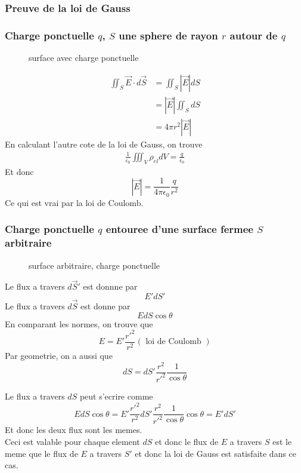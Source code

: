 \documentclass[../main.tex]{subfiles}
\begin{document}
\subsubsection{Preuve de la loi de Gauss}
\subsubsection*{Charge ponctuelle $q$, $S$ une sphere de rayon $r$ autour de $q$}

\begin{figure}[H]
    \centering
    \caption{surface avec charge ponctuelle}
    \label{fig:surface-avec-charge-ponctuelle}
\end{figure}
\begin{align*}
\iint_S \vec{E} \cdot d \vec{S} &= \iint_S |\vec{E}| d S\\
&= |\vec{E}| \iint_S d S\\
&= 4 \pi r^{2} |\vec{E}|
\end{align*}
En calculant l'autre cote de la loi de Gauss, on trouve
\begin{align*}
\frac{1}{\epsilon_0} \iiint_V\rho_{el}  d V = \frac{q}{\epsilon_0}
\end{align*}
Et donc 
\[ 
|\vec{E}| = \frac{1}{4 \pi \epsilon_0} \frac{q}{r^{2}}
\]
Ce qui est vrai par la loi de Coulomb.

\subsubsection*{Charge ponctuelle $q$ entouree d'une surface fermee $S$ arbitraire}

\begin{figure}[H]
    \centering
    \caption{surface arbitraire, charge ponctuelle}
    \label{fig:surface-arbitraire,-charge-ponctuelle}
\end{figure}
Le flux a travers $d\vec{S}'$ est donnne par
\[ 
E' dS'
\]
Le flux a travers $d \vec{S}$ est donne par
\[ 
E dS \cos \theta 
\]
En comparant les normes, on trouve que
\[ 
	E = E' \frac{r'^{2}}{r^{2}} ( \text{ loi de Coulomb } ) 
\]
Par geometrie, on a aussi que
\[ 
d S = d S' \frac{r^{2}}{r'^{2}} \frac{1}{\cos \theta}
\]

Le flux a travers $dS$ peut s'ecrire comme
\[ 
E dS \cos \theta = E' \frac{r'^{2}}{r^{2} } dS' \frac{r^{2}}{r'^{2}} \frac{1}{\cos \theta }\cos \theta = E' dS'
\]
Et donc les deux flux sont les memes.\\
Ceci est valable pour chaque element $dS$ et donc le flux de  $E$ a travers $S$ est le meme que le flux de $E$ a travers $S'$ et donc la loi de Gauss est satisfaite dans ce cas.
\end{document}
